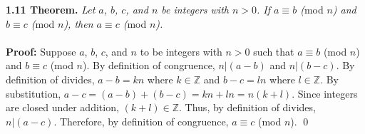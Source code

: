 \documentclass[12pt]{article}
\begin{document}
\noindent \textbf{1.11 Theorem.} \emph{Let $a$, $b$, $c$, and $n$ be integers with $n>0$. If $a \equiv b$ (}mod\emph{ $n$) and $b \equiv c$ (}mod\emph{ $n$), then $a \equiv c$ (}mod\emph{ $n$).}
~\\
~\\
\textbf{Proof:} 
Suppose $a$, $b$, $c$, and $n$ to be integers with $n>0$ such that $a \equiv b$ (mod $n$) and $b \equiv c$ (mod $n$). By definition of congruence, $n \vert (a - b)$ and $n \vert (b - c)$. By definition of divides, $a - b = kn$ where $k \in \mathbb{Z}$ and $b - c = ln$ where $l \in \mathbb{Z}$. By substitution, $a - c = (a - b) + (b - c) = kn + ln = n( k + l)$. Since integers are closed under addition, $(k + l) \in \mathbb{Z}$. Thus, by definition of divides, $n \vert (a - c)$. Therefore, by definition of congruence, $a \equiv c$ (mod $n$). \qed
\end{document}
